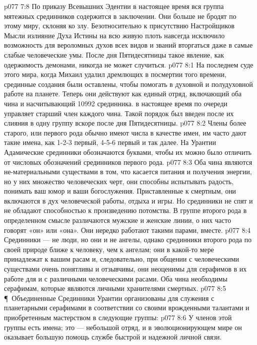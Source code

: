 \vs p077 7:8 По приказу Всевышних Эдентии в настоящее время вся группа мятежных срединников содержится в заключении. Они больше не бродят по этому миру, склоняя ко злу. Безотносительно к присутствию Настройщиков Мысли излияние Духа Истины на всю живую плоть навсегда исключило возможность для вероломных духов всех видов и званий вторгаться даже в самые слабые человеческие умы. После дня Пятидесятницы такое явление, как одержимость демонами, никогда не может случиться.
\vs p077 8:1 На последнем суде этого мира, когда Михаил удалил дремлющих в посмертии того времени, срединные создания были оставлены, чтобы помогать в духовной и полудуховной работе на планете. Теперь они действуют как единый отряд, включающий оба чина и насчитывающий 10992 срединника.  в настоящее время по очереди управляет старший член каждого чина. Такой порядок был введен после их слияния в одну группу вскоре после дня Пятидесятницы.
\vs p077 8:2 Члены более старого, или первого рода обычно имеют числа в качестве имен, им часто дают такие имена, как 1\hyp{}2\hyp{}3 первый, 4\hyp{}5\hyp{}6 первый и так далее. На Урантии Адамические срединники обозначаются буквами, чтобы их можно было отличить от числовых обозначений срединников первого рода.
\vs p077 8:3 Оба чина являются не\hyp{}материальными существами в том, что касается питания и получения энергии, но у них множество человеческих черт, они способны испытывать радость, понимать ваш юмор и ваши богослужения. Приставленные к смертным, они включаются в дух человеческой работы, отдыха и игры. Но срединники не спят и не обладают способностью к произведению потомства. В группе второго рода в определенном смысле различаются мужские и женские линии, о них часто говорят «он» или «она». Они нередко работают такими парами, вместе.
\vs p077 8:4 Срединники --- не люди, но они и не ангелы, однако срединники второго рода по своей природе ближе к человеку, чем к ангелам; они в какой\hyp{}то мере принадлежат к вашим расам и, следовательно, при общении с человеческими существами очень понятливы и отзывчивы, они неоценимы для серафимов в их работе для и с различными человеческими расами. Оба чина необходимы серафимам, которые являются личными хранителями смертных.
\vs p077 8:5 \P\ Объединенные Срединники Урантии организованы для служения с планетарными серафимами в соответствии со своими врожденными талантами и приобретенным мастерством в следующие группы:
\vs p077 8:6 \bibnobreakspace {} У членов этой группы есть имена; это --- небольшой отряд, и в эволюционирующем мире он оказывает большую помощь службе быстрой и надежной личной связи.
